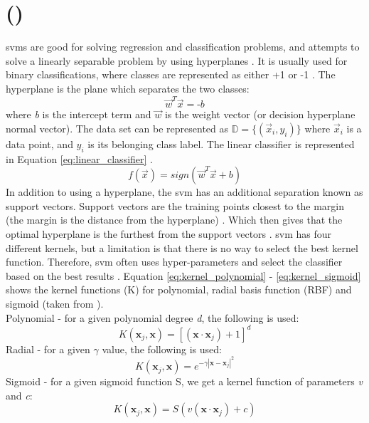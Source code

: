 \section[SVM]{ ()}
\label{sec:svm}

\gls{svm}s are good for solving regression and classification problems, and attempts to solve a linearly separable problem by using hyperplanes \cite{Duda2001, Kononenko2007, Russell2013}.
It is usually used for binary classifications, where classes are represented as either +1 or -1 \cite{Manning2008, Russell2013}. 
The hyperplane is the plane which separates the two classes: 
\begin{equation}\label{eq:hyperplane}
\vec{w}^{T}\vec{x} = \textit{-b} 
\end{equation}
where \textit{b} is the intercept term and $\vec{w}$ is the weight vector (or decision hyperplane normal vector).
The data set can be represented as $\mathbb{D} = \{(\vec{x}_{i}, y_{i})\}$ where $\vec{x}_{i}$ is a data point, and $ y_{i}$ is its belonging class label.
The linear classifier is represented in Equation \ref{eq:linear_classifier}  \cite[p.~295-296]{Manning2008}. 
\begin{equation}\label{eq:linear_classifier}
f(\vec{x}) = sign(\vec{w}^{T}\vec{x} + b)
\end{equation}
In addition to using a hyperplane, the \gls{svm} has an additional separation known as support vectors. 
Support vectors are the training points closest to the margin (the margin is the distance from the hyperplane) \cite{Duda2001, Manning2008}.
Which then gives that the optimal hyperplane is the furthest from the support vectors \cite{Kononenko2007}.
\gls{svm} has four different kernels, but a limitation is that there is no way to select the best kernel function. 
Therefore, \gls{svm} often uses hyper-parameters and select the classifier based on the best results \cite{Theodoridis2009}.
Equation \ref{eq:kernel_polynomial} - \ref{eq:kernel_sigmoid} shows the kernel functions (K) for polynomial, radial basis function (RBF) and sigmoid (taken from \cite[p.~273]{Kononenko2007}). \\
Polynomial - for a given polynomial degree \textit{d}, the following is used:
\begin{equation}\label{eq:kernel_polynomial}
K (\textbf{x}_{j}, \textbf{x}) = [(\textbf{x}  \cdot \textbf{x}_{j}) + 1]^{d}
\end{equation}
Radial - for a given $\gamma$ value, the following is used:
\begin{equation}\label{eq:kernel_rbf}
K (\textbf{x}_{j}, \textbf{x}) = e^{-\gamma|\textbf{x}-\textbf{x}_{j}|^{2}}
\end{equation}
Sigmoid - for a given sigmoid function S, we get a kernel function of parameters \textit{v} and \textit{c}: 
\begin{equation}\label{eq:kernel_sigmoid}
K (\textbf{x}_{j}, \textbf{x}) = S(\textit{v}(\textbf{x}  \cdot \textbf{x}_{j}) + c)
\end{equation}

